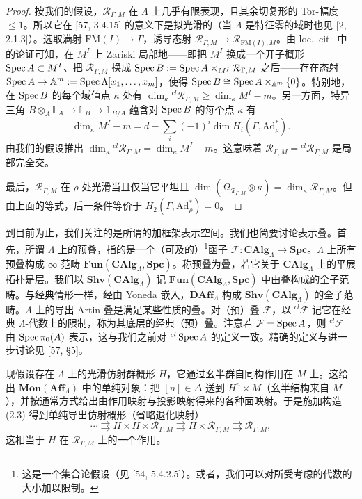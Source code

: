 \begin{proof}
按我们的假设，$\mathcal R_{\Gamma,M}$ 在 $\Lambda$ 上几乎有限表现，且其余切复形的 Tor-幅度 $\le 1$。所以它在 [57, 3.4.15] 的意义下是拟光滑的（当 $\Lambda$ 是特征零的域时也见 [2, 2.1.3]）。选取满射 $\mathrm{FM}(I)\to\Gamma$，诱导态射 $\mathcal R_{\Gamma,M}\to\mathcal R_{\mathrm{FM}(I),M}$。由 loc.\ cit.\ 中的论证可知，在 $M^I$ 上 Zariski 局部地——即把 $M^I$ 换成一个开子概形 $\operatorname{Spec} A\subset M^I$、把 $\mathcal R_{\Gamma,M}$ 换成 $\operatorname{Spec} B:=\operatorname{Spec} A\times_{M^I}\mathcal R_{\Gamma,M}$ 之后——存在态射 $\operatorname{Spec} A\to\mathbb A^m:=\operatorname{Spec}\Lambda[x_1,\dots,x_m]$，使得 $\operatorname{Spec} B\cong\operatorname{Spec} A\times_{\mathbb A^m}\{0\}$。特别地，在 $\operatorname{Spec} B$ 的每个域值点 $\kappa$ 处有 $\dim_\kappa{}^{cl}\mathcal R_{\Gamma,M}\ge\dim_\kappa M^I-m$。另一方面，特异三角 $B\otimes_A\mathbb L_A\to\mathbb L_B\to\mathbb L_{B/A}$ 蕴含对 $\operatorname{Spec} B$ 的每个点 $\kappa$ 有
\[
\dim_\kappa M^I-m=d-\sum_i(-1)^i\dim H_i(\Gamma,\mathrm{Ad}^*_\rho).
\]
由我们的假设推出 $\dim_\kappa{}^{cl}\mathcal R_{\Gamma,M}=\dim_\kappa M^I-m$。这意味着 $\mathcal R_{\Gamma,M}={}^{cl}\mathcal R_{\Gamma,M}$ 是局部完全交。

最后，$\mathcal R_{\Gamma,M}$ 在 $\rho$ 处光滑当且仅当它平坦且 $\dim(\Omega_{\mathcal R_{\Gamma,M}}\otimes\kappa)=\dim_\kappa\mathcal R_{\Gamma,M}$。但由上面的等式，后一条件等价于 $H_2(\Gamma,\mathrm{Ad}^*_\rho)=0$。
\end{proof}

到目前为止，我们关注的是所谓的加框架表示空间。我们也简要讨论表示叠。首先，所谓 $\Lambda$ 上的预叠，指的是一个（可及的）\footnote{这是一个集合论假设（见 [54, 5.4.2.5]）。或者，我们可以对所受考虑的代数的大小加以限制。}函子 $\mathcal F:\mathbf{CAlg}_\Lambda\to\mathbf{Spc}$。$\Lambda$ 上所有预叠构成 $\infty$-范畴 $\mathbf{Fun}(\mathbf{CAlg}_\Lambda,\mathbf{Spc})$。称预叠为叠，若它关于 $\mathbf{CAlg}_\Lambda$ 上的平展拓扑是层。我们以 $\mathbf{Shv}(\mathbf{CAlg}_\Lambda)$ 记 $\mathbf{Fun}(\mathbf{CAlg}_\Lambda,\mathbf{Spc})$ 中由叠构成的全子范畴。与经典情形一样，经由 Yoneda 嵌入，$\mathbf{DAff}_\Lambda$ 构成 $\mathbf{Shv}(\mathbf{CAlg}_\Lambda)$ 的全子范畴。$\Lambda$ 上的导出 Artin 叠是满足某些性质的叠。对（预）叠 $\mathcal F$，以 ${}^{cl}\mathcal F$ 记它在经典 $\Lambda$-代数上的限制，称为其底层的经典（预）叠。注意若 $\mathcal F=\operatorname{Spec} A$，则 ${}^{cl}\mathcal F$ 由 $\operatorname{Spec}\pi_0(A)$ 表示，这与我们之前对 ${}^{cl}\operatorname{Spec} A$ 的定义一致。精确的定义与进一步讨论见 [57, §5]。

现假设存在 $\Lambda$ 上的光滑仿射群概形 $H$，它通过幺半群自同构作用在 $M$ 上。这给出 $\mathbf{Mon}(\mathbf{Aff}_\Lambda)$ 中的单纯对象：把 $[n]\in\Delta$ 送到 $H^n\times M$（幺半结构来自 $M$），并按通常方式给出由作用映射与投影映射得来的各种面映射。于是施加构造 (2.3) 得到单纯导出仿射概形（省略退化映射）
\begin{equation}\tag{2.19}
\cdots\rightrightarrows H\times H\times\mathcal R_{\Gamma,M}\rightrightarrows H\times\mathcal R_{\Gamma,M}\rightrightarrows\mathcal R_{\Gamma,M},
\end{equation}
这相当于 $H$ 在 $\mathcal R_{\Gamma,M}$ 上的一个作用。

